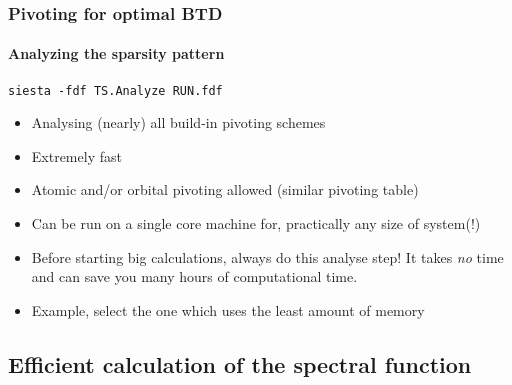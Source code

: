 \begin{frame}
  \frametitle{Pivoting for optimal BTD}
  \framesubtitle{Analyzing the sparsity pattern}

  \begin{center}
    \texttt{siesta -fdf TS.Analyze RUN.fdf}
  \end{center}

  \begin{itemize}[<+->]
    \item Analysing (nearly) all build-in pivoting schemes

    \item Extremely fast

    \item Atomic and/or orbital pivoting allowed (similar pivoting table)

    \item Can be run on a single core machine for, practically any size of system(!)

    \item Before starting big calculations, always do this analyse step! It takes
    \emph{no} time and can save you many hours of computational time.

    \item Example, select the one which uses the least amount of memory

  \end{itemize}

\end{frame}


\subsection{Efficient calculation of the spectral function}

